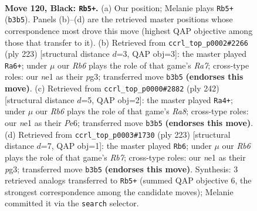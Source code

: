 \documentclass[11pt]{article}
\begin{document}
\clearpage

\begin{figure}[p]\centering
\begin{subfigure}{0.46\textwidth}\centering
\resizebox{\linewidth}{!}{%
\newchessgame
\chessboard[
  setfen={8/4k3/R7/6K1/6P1/1r6/8/4N3 b - - 24 120},
  showmover=false,
  pgfstyle=straightmove, color=movearrow, markmove={b3-b5}
]}
\caption{}
\end{subfigure}\hfill
\begin{subfigure}{0.46\textwidth}\centering
\resizebox{\linewidth}{!}{%
\newchessgame
\chessboard[
  setfen={6k1/1R6/6K1/6P1/8/6P1/r7/8 b - - 20 112},
  showmover=false,
  pgfstyle=straightmove, color=movearrow, markmove={a2-a6}
]}
\caption{}
\end{subfigure}
\\[4pt]
\begin{subfigure}{0.46\textwidth}\centering
\resizebox{\linewidth}{!}{%
\newchessgame
\chessboard[
  setfen={R7/6r1/4P3/3p4/3k4/7K/8/8 w - - 3 122},
  showmover=false,
  pgfstyle=straightmove, color=movearrow, markmove={a8-a4}
]}
\caption{}
\end{subfigure}\hfill
\begin{subfigure}{0.46\textwidth}\centering
\resizebox{\linewidth}{!}{%
\newchessgame
\chessboard[
  setfen={6k1/3R4/8/7K/6P1/6P1/1r6/8 b - - 4 112},
  showmover=false,
  pgfstyle=straightmove, color=movearrow, markmove={b2-b6}
]}
\caption{}
\end{subfigure}
\caption{\textbf{Move 120, Black: \texttt{Rb5+}.} (a) Our position; Melanie plays \texttt{Rb5+} (\texttt{b3b5}). Panels (b)--(d) are the retrieved master positions whose correspondence most drove this move (highest QAP objective among those that transfer to it). (b) Retrieved from \texttt{ccrl\_top\_p0002\#2266} (ply 223) [structural distance $d$=3, QAP obj=3]: the master played \texttt{Ra6+}; under $\mu$ our \emph{Rb6} plays the role of that game's \emph{Ra7}; cross-type roles: our \emph{n}e1 as their \emph{p}g3; transferred move \texttt{b3b5} \textbf{(endorses this move)}. (c) Retrieved from \texttt{ccrl\_top\_p0000\#2882} (ply 242) [structural distance $d$=5, QAP obj=2]: the master played \texttt{Ra4+}; under $\mu$ our \emph{Rb6} plays the role of that game's \emph{Ra8}; cross-type roles: our \emph{n}e1 as their \emph{P}e6; transferred move \texttt{b3b5} \textbf{(endorses this move)}. (d) Retrieved from \texttt{ccrl\_top\_p0003\#1730} (ply 223) [structural distance $d$=7, QAP obj=1]: the master played \texttt{Rb6}; under $\mu$ our \emph{Rb6} plays the role of that game's \emph{Rb7}; cross-type roles: our \emph{n}e1 as their \emph{p}g3; transferred move \texttt{b3b5} \textbf{(endorses this move)}. Synthesis: 3 retrieved analogs transferred to \texttt{Rb5+} (summed QAP objective 6, the strongest correspondence among the candidate moves); Melanie committed it via the \texttt{search} selector.}
\label{fig:thought-m239}
\end{figure}
\end{document}
